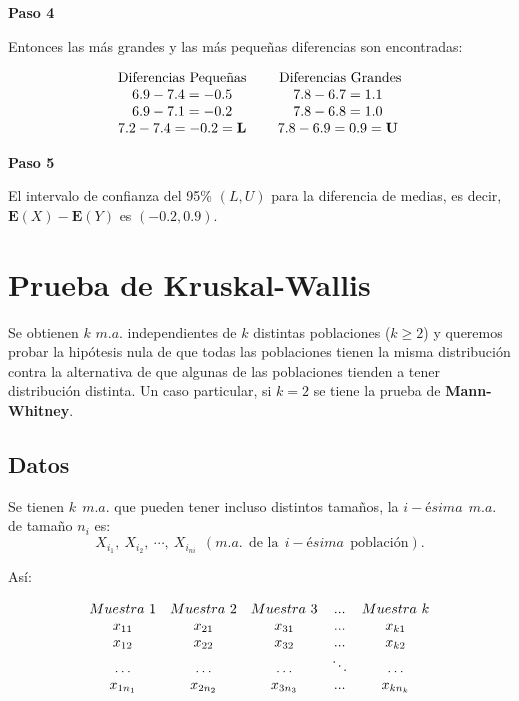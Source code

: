 \documentclass[
  a4paper,
  oneside,
  openany]{book}
\begin{document}
\textbf{Paso 4}

Entonces las más grandes y las más pequeñas diferencias son encontradas:

\[
\begin{array}{c c c c}
\mbox{Diferencias Pequeñas} & & \mbox{ Diferencias Grandes} \\
6.9 - 7.4 = -0.5 & & 7.8 - 6.7 = 1.1\\
6.9 - 7.1 = -0.2 & & 7.8 - 6.8 = 1.0\\
7.2 - 7.4 = -0.2 = \textbf{L} & & 7.8 - 6.9 = 0.9 = \textbf{U}\\
\end{array}
\]

\textbf{Paso 5}

El intervalo de confianza del 95\% \((L,U)\) para la diferencia de medias, es decir, \(\mathbf{E}(X)-\mathbf{E}(Y)\) es \((-0.2,0.9)\).

\hypertarget{prueba-de-kruskal-wallis}{%
\chapter{Prueba de Kruskal-Wallis}\label{prueba-de-kruskal-wallis}}

Se obtienen \(k\) \(m.a.\) independientes de \(k\) distintas poblaciones (\(k\geq 2\)) y queremos probar la hipótesis nula de que todas las poblaciones tienen la misma distribución contra la alternativa de que algunas de las poblaciones tienden a tener distribución distinta.
Un caso particular, si \(k=2\) se tiene la prueba de \textbf{Mann-Whitney}.

\hypertarget{datos-7}{%
\section{Datos}\label{datos-7}}

Se tienen \(k\ \ m.a.\) que pueden tener incluso distintos tamaños, la \(i-ésima\ \ m.a.\) de tamaño \(n_{i}\) es:
\[X_{i_1},\ X_{i_2},\ \cdots, \ X_{i_{ni}} \ \ (m.a. \ \ \mbox{de la} \ \ i-ésima \ \ \mbox{población}).\]

Así:

\[
\begin{array}{c c c c c} 
Muestra \ 1&Muestra\ 2&Muestra\ 3&...&Muestra\ k \\
x_{11}&x_{21}&x_{31}&...&x_{k1}\\
x_{12}&x_{22}&x_{32}&...&x_{k2}\\
\ldots&\ldots&\ldots&\ddots&\ldots\\
x_{1n_1}&x_{2n_2}&x_{3n_3}&...&x_{kn_k}\\
\end{array}
\]
\end{document}
